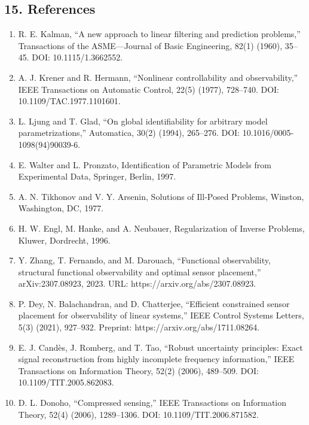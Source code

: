 \documentclass[11pt]{article}
\begin{document}
\subsection*{15. References}
\begin{enumerate}
\item R. E. Kalman, “A new approach to linear filtering and prediction problems,” Transactions of the ASME—Journal of Basic Engineering, 82(1) (1960), 35–45. DOI: 10.1115/1.3662552.
\item A. J. Krener and R. Hermann, “Nonlinear controllability and observability,” IEEE Transactions on Automatic Control, 22(5) (1977), 728–740. DOI: 10.1109/TAC.1977.1101601.
\item L. Ljung and T. Glad, “On global identifiability for arbitrary model parametrizations,” Automatica, 30(2) (1994), 265–276. DOI: 10.1016/0005-1098(94)90039-6.
\item E. Walter and L. Pronzato, Identification of Parametric Models from Experimental Data, Springer, Berlin, 1997.
\item A. N. Tikhonov and V. Y. Arsenin, Solutions of Ill-Posed Problems, Winston, Washington, DC, 1977.
\item H. W. Engl, M. Hanke, and A. Neubauer, Regularization of Inverse Problems, Kluwer, Dordrecht, 1996.
\item Y. Zhang, T. Fernando, and M. Darouach, “Functional observability, structural functional observability and optimal sensor placement,” arXiv:2307.08923, 2023. URL: https://arxiv.org/abs/2307.08923.
\item P. Dey, N. Balachandran, and D. Chatterjee, “Efficient constrained sensor placement for observability of linear systems,” IEEE Control Systems Letters, 5(3) (2021), 927–932. Preprint: https://arxiv.org/abs/1711.08264.
\item E. J. Candès, J. Romberg, and T. Tao, “Robust uncertainty principles: Exact signal reconstruction from highly incomplete frequency information,” IEEE Transactions on Information Theory, 52(2) (2006), 489–509. DOI: 10.1109/TIT.2005.862083.
\item D. L. Donoho, “Compressed sensing,” IEEE Transactions on Information Theory, 52(4) (2006), 1289–1306. DOI: 10.1109/TIT.2006.871582.
\end{enumerate}
\end{document}
